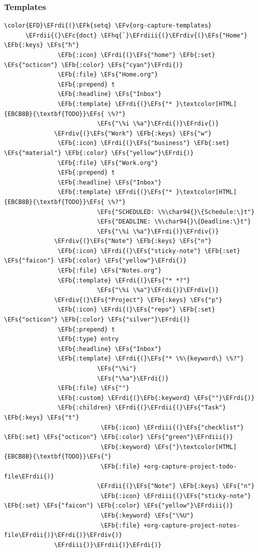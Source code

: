 \documentclass{scrartcl}
\newcommand{\EFk}[1]{\textcolor{EFk}{#1}} %
\newcommand{\EFs}[1]{\textcolor{EFs}{#1}} %
\newcommand{\EFb}[1]{\textcolor{EFb}{#1}} %
\newcommand{\EFc}[1]{\textcolor{EFc}{#1}} %
\newcommand{\EFv}[1]{\textcolor{EFv}{#1}} %
\newcommand{\EFhq}[1]{#1} %
\newcommand{\EFrdi}[1]{#1} %
\newcommand{\EFrdii}[1]{#1} %
\newcommand{\EFrdiii}[1]{#1} %
\newcommand{\EFrdiv}[1]{#1} %
\begin{document}
\subsubsection{Templates}
\label{sec:org67d5321}
\begin{Code}
\begin{Verbatim}[]
\color{EFD}\EFrdi{(}\EFk{setq} \EFv{org-capture-templates}
      \EFrdii{(}\EFc{doct} \EFhq{`}\EFrdiii{(}\EFrdiv{(}\EFs{"Home"} \EFb{:keys} \EFs{"h"}
               \EFb{:icon} \EFrdi{(}\EFs{"home"} \EFb{:set} \EFs{"octicon"} \EFb{:color} \EFs{"cyan"}\EFrdi{)}
               \EFb{:file} \EFs{"Home.org"}
               \EFb{:prepend} t
               \EFb{:headline} \EFs{"Inbox"}
               \EFb{:template} \EFrdi{(}\EFs{"* }\textcolor[HTML]{EBCB8B}{\textbf{TODO}}\EFs{ \%?"}
                          \EFs{"\%i \%a"}\EFrdi{)}\EFrdiv{)}
              \EFrdiv{(}\EFs{"Work"} \EFb{:keys} \EFs{"w"}
               \EFb{:icon} \EFrdi{(}\EFs{"business"} \EFb{:set} \EFs{"material"} \EFb{:color} \EFs{"yellow"}\EFrdi{)}
               \EFb{:file} \EFs{"Work.org"}
               \EFb{:prepend} t
               \EFb{:headline} \EFs{"Inbox"}
               \EFb{:template} \EFrdi{(}\EFs{"* }\textcolor[HTML]{EBCB8B}{\textbf{TODO}}\EFs{ \%?"}
                          \EFs{"SCHEDULED: \%\char94{}\{Schedule:\}t"}
                          \EFs{"DEADLINE: \%\char94{}\{Deadline:\}t"}
                          \EFs{"\%i \%a"}\EFrdi{)}\EFrdiv{)}
              \EFrdiv{(}\EFs{"Note"} \EFb{:keys} \EFs{"n"}
               \EFb{:icon} \EFrdi{(}\EFs{"sticky-note"} \EFb{:set} \EFs{"faicon"} \EFb{:color} \EFs{"yellow"}\EFrdi{)}
               \EFb{:file} \EFs{"Notes.org"}
               \EFb{:template} \EFrdi{(}\EFs{"* *?"}
                          \EFs{"\%i \%a"}\EFrdi{)}\EFrdiv{)}
              \EFrdiv{(}\EFs{"Project"} \EFb{:keys} \EFs{"p"}
               \EFb{:icon} \EFrdi{(}\EFs{"repo"} \EFb{:set} \EFs{"octicon"} \EFb{:color} \EFs{"silver"}\EFrdi{)}
               \EFb{:prepend} t
               \EFb{:type} entry
               \EFb{:headline} \EFs{"Inbox"}
               \EFb{:template} \EFrdi{(}\EFs{"* \%\{keyword\} \%?"}
                          \EFs{"\%i"}
                          \EFs{"\%a"}\EFrdi{)}
               \EFb{:file} \EFs{""}
               \EFb{:custom} \EFrdi{(}\EFb{:keyword} \EFs{""}\EFrdi{)}
               \EFb{:children} \EFrdi{(}\EFrdii{(}\EFs{"Task"} \EFb{:keys} \EFs{"t"}
                           \EFb{:icon} \EFrdiii{(}\EFs{"checklist"} \EFb{:set} \EFs{"octicon"} \EFb{:color} \EFs{"green"}\EFrdiii{)}
                           \EFb{:keyword} \EFs{"}\textcolor[HTML]{EBCB8B}{\textbf{TODO}}\EFs{"}
                           \EFb{:file} +org-capture-project-todo-file\EFrdii{)}
                          \EFrdii{(}\EFs{"Note"} \EFb{:keys} \EFs{"n"}
                           \EFb{:icon} \EFrdiii{(}\EFs{"sticky-note"} \EFb{:set} \EFs{"faicon"} \EFb{:color} \EFs{"yellow"}\EFrdiii{)}
                           \EFb{:keyword} \EFs{"\%U"}
                           \EFb{:file} +org-capture-project-notes-file\EFrdii{)}\EFrdi{)}\EFrdiv{)}
              \EFrdiii{)}\EFrdii{)}\EFrdi{)}
\end{Verbatim}
\end{Code}
\end{document}

